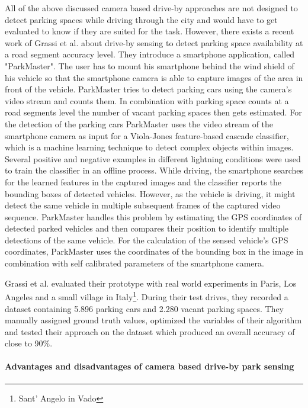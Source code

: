All of the above discussed camera based drive-by approaches are not designed to detect parking spaces while driving through the city and would have to get evaluated to know if they are suited for the task. However, there exists a recent work of Grassi et al. \cite{Grassi:2017:PIE:3132211.3134452} about drive-by sensing to detect parking space availability at a road segment accuracy level. They introduce a smartphone application, called "ParkMaster". The user has to mount his smartphone behind the wind shield of his vehicle so that the smartphone camera is able to capture images of the area in front of the vehicle. ParkMaster tries to detect parking cars using the camera's video stream and counts them. In combination with parking space counts at a road segments level the number of vacant parking spaces then gets estimated. For the detection of the parking cars ParkMaster uses the video stream of the smartphone camera as input for a Viola-Jones feature-based cascade classifier, which is a machine learning technique to detect complex objects within images. Several positive and negative examples in different lightning conditions were used to train the classifier in an offline process. While driving, the smartphone searches for the learned features in the captured images and the classifier reports the bounding boxes of detected vehicles. However, as the vehicle is driving, it might detect the same vehicle in multiple subsequent frames of the captured video sequence. ParkMaster handles this problem by estimating the GPS coordinates of detected parked vehicles and then compares their position to identify multiple detections of the same vehicle. 
For the calculation of the sensed vehicle's GPS coordinates, ParkMaster uses the coordinates of the bounding box in the image in combination with self calibrated parameters of the smartphone camera.

Grassi et al. evaluated their prototype with real world experiments in Paris, Los Angeles and a small village in Italy\footnote{Sant' Angelo in Vado}. During their test drives, they recorded a dataset containing 5.896 parking cars and 2.280 vacant parking spaces. They manually assigned ground truth values, optimized the variables of their algorithm and tested their approach on the dataset which produced an overall accuracy of close to 90\%.



\paragraph{Advantages and disadvantages of camera based drive-by park sensing}


